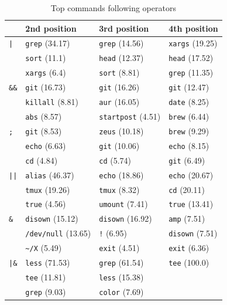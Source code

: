 \begin{table}[h]
	\caption{Top commands following operators}
	\label{tab:operators}
	\begin{tabular}{ll|l|l}    
		\toprule
		& 2nd position & 3rd position & 4th position \\
		\midrule
		\verb!|! & \verb|grep| {\small (\num{34.17})} & \verb|grep| {\small (\num{14.56})} & \verb|xargs| {\small (\num{19.25})} \\     
		& \verb|sort| {\small (\num{11.1})} & \verb|head| {\small (\num{12.37})}& \verb|head| {\small (\num{17.52})}\\ 
		& \verb|xargs| {\small (\num{6.4})} & \verb|sort| {\small (\num{8.81})} & \verb|grep| {\small (\num{11.35})}\\ 
		\midrule
		\verb!&&! & \verb|git| {\small (\num{16.73})} & \verb|git| {\small (\num{16.26})} & \verb|git| {\small (\num{12.47})} \\ 
		& \verb|killall| {\small (\num{8.81})} & \verb|aur| {\small (\num{16.05})} & \verb|date| {\small (\num{8.25})}\\ 
		& \verb|abs| {\small (\num{8.57})} & \verb|startpost| {\small (\num{4.51})} & \verb|brew| {\small (\num{6.44})} \\ 
		\midrule
		\verb!;! & \verb|git| {\small (\num{8.53})} & \verb|zeus| {\small (\num{10.18})} & \verb|brew| {\small (\num{9.29})}\\ 
		& \verb|echo| {\small (\num{6.63})}& \verb|git| {\small (\num{10.06})}  & \verb|echo| {\small (\num{8.15})} \\ 
		&  \verb|cd| {\small (\num{4.84})} & \verb|cd| {\small (\num{5.74})} &  \verb|git| {\small (\num{6.49})}\\ 
		\midrule
		\verb!||! & \verb|alias| {\small (\num{46.37})} & \verb|echo| {\small (\num{18.86})} & \verb|echo| {\small (\num{20.67})} \\ 
		& \verb|tmux| {\small (\num{19.26})} & \verb|tmux| {\small (\num{8.32})}  &  \verb|cd| {\small (\num{20.11})} \\ 
		& \verb|true| {\small (\num{4.56})} &  \verb|umount| {\small (\num{7.41})} & \verb|true| {\small (\num{13.41})}\\ 
		\midrule
		\verb!&! & \verb|disown| {\small (\num{15.12})} & \verb|disown| {\small (\num{16.92})} & \verb|amp| {\small (\num{7.51})} \\
		& \verb|/dev/null| {\small (\num{13.65})} & \verb|!| {\small (\num{6.95})} & \verb|disown| {\small (\num{7.51})} \\
		& \verb|~/X| {\small (\num{5.49})} & \verb|exit| {\small (\num{4.51})} & \verb|exit| {\small (\num{6.36})} \\    
		\midrule
		\verb!|&! & \verb|less| {\small (\num{71.53})} & \verb|grep| {\small (\num{61.54})} & \verb|tee| {\small (\num{100.0})} \\
		& \verb|tee| {\small (\num{11.81})}  & \verb|less| {\small (\num{15.38})} &  \\
		& \verb|grep| {\small (\num{9.03})} & \verb|color| {\small (\num{7.69})} &  \\
		\midrule
	\end{tabular}
\end{table}

